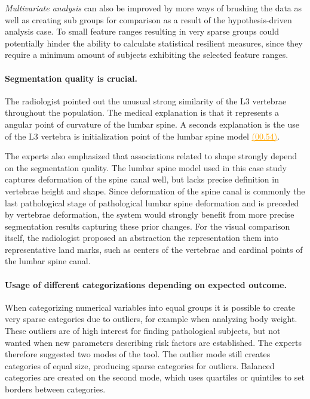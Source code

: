 \documentclass[journal]{style/vgtc} 			          %
\newcommand{\com}[1]{\textcolor{orange}{\uline{#1}}}
\begin{document}
\emph{Multivariate analysis} can also be improved by more ways of brushing the data as well as creating sub groups for comparison as a result of the hypothesis-driven analysis case.
%
To small feature ranges resulting in very sparse groups could potentially hinder the ability to calculate statistical resilient measures, since they require a minimum amount of subjects exhibiting the selected feature ranges.
%

\paragraph{Segmentation quality is crucial.}
The radiologist pointed out the unusual strong similarity of the L3 vertebrae throughout the population.
%
The medical explanation is that it represents a angular point of curvature of the lumbar spine.
%
A seconds explanation is the use of the L3 vertebra is initialization point of the lumbar spine model \com{(00.54)}.

The experts also emphasized that associations related to shape strongly depend on the segmentation quality.
%
The lumbar spine model used in this case study captures deformation of the spine canal well, but lacks precise definition in vertebrae height and shape.
%
Since deformation of the spine canal is commonly the last pathological stage of pathological lumbar spine deformation and is preceded by vertebrae deformation, the system would strongly benefit from more precise segmentation results capturing these prior changes.
%
For the visual comparison itself, the radiologist proposed an abstraction the representation them into representative land marks, such as centers of the vertebrae and cardinal points of the lumbar spine canal.

\paragraph{Usage of different categorizations depending on expected outcome.}
When categorizing numerical variables into equal groups it is possible to create very sparse categories due to outliers, for example when analyzing body weight.
%
These outliers are of high interest for finding pathological subjects, but not wanted when new parameters describing risk factors are established.
%
The experts therefore suggested two modes of the tool.
%
The outlier mode still creates categories of equal size, producing sparse categories for outliers.
%
Balanced categories are created on the second mode, which uses quartiles or quintiles to set borders between categories.
\end{document}
